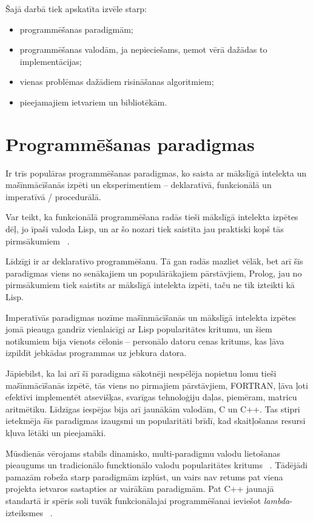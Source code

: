 \documentclass{ludis}
\begin{document}
Šajā darbā tiek apskatīta izvēle starp:
\begin{itemize}
\item programmēšanas paradigmām;
\item programmēšanas valodām, ja nepieciešams, ņemot vērā dažādas to implementācijas;
\item vienas problēmas dažādiem risināšanas algoritmiem;
\item pieejamajiem ietvariem un bibliotēkām.
\end{itemize}

\section{Programmēšanas paradigmas} \label{sec:paradigms}
Ir trīs populāras programmēšanas paradigmas, ko saista ar mākslīgā intelekta un mašīnmācīšanās izpēti un eksperimentiem -- deklaratīvā, funkcionālā un imperatīvā / procedurālā. 

Var teikt, ka funkcionālā programmēšana radās tieši mākslīgā intelekta izpētes dēļ, jo īpaši valoda Lisp, un ar šo nozari tiek saistīta jau praktiski kopš tās pirmsākumiem ~\cite{hist_lisp}. 

Līdzīgi ir ar deklaratīvo programmēšanu. Tā gan radās mazliet vēlāk, bet arī šīs paradigmas viens no senākajiem un populārākajiem pārstāvjiem, Prolog, jau no pirmsākumiem tiek saistīts ar mākslīgā intelekta izpēti, taču ne tik izteikti kā Lisp.

Imperatīvās paradigmas nozīme mašīnmācīšanās un mākslīgā intelekta izpētes jomā pieauga gandrīz vienlaicīgi ar Lisp popularitātes kritumu, un šiem notikumiem bija vienots cēlonis -- personālo datoru cenas kritums, kas ļāva izpildīt jebkādas programmas uz jebkura datora. 

Jāpiebilst, ka lai arī šī paradigma sākotnēji nespēlēja nopietnu lomu tieši mašīnmācīšanās izpētē, tās viens no pirmajiem pārstāvjiem, FORTRAN, ļāva ļoti efektīvi implementēt atsevišķas, svarīgas tehnoloģiju daļas, piemēram, matricu aritmētiku. Līdzīgas iespējas bija arī jaunākām valodām, C un C++. Tas stipri ietekmēja šīs paradigmas izaugsmi un popularitāti brīdī, kad skaitļošanas resursi kļuva lētāki un pieejamāki.

Mūsdienās vērojams stabils dinamisko, multi-paradigmu valodu lietošanas pieaugums un tradicionālo funcktionālo valodu popularitātes kritums ~\cite{tiobe_index}. Tādējādi pamazām robeža starp paradigmām izplūst, un vairs nav retums pat viena projekta ietvaros sastapties ar vairākām paradigmām. Pat C++ jaunajā standartā ir spēris soli tuvāk funkcionālajai programmēšanai ieviešot {\em lambda}-izteiksmes ~\cite{iso_cpp11}.
\end{document}
